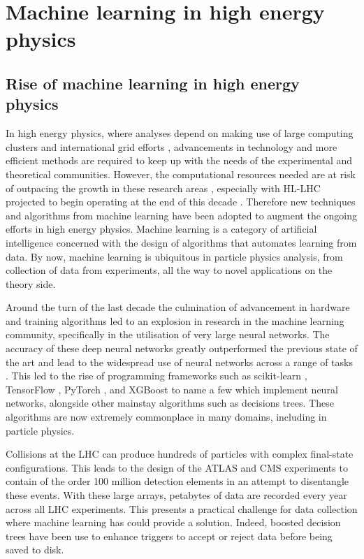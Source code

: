 \documentclass[main.tex]{subfiles}
\begin{document}
\chapter{Machine learning in high energy physics}
\label{chapter:ml}
\section{Rise of machine learning in high energy physics}
    In high energy physics, where analyses
    depend on making use of large computing clusters
    and international grid efforts \cite{WLCG}, advancements
    in technology and more efficient methods are
    required to keep up with the needs of the
    experimental and theoretical communities.
    However, the computational resources needed
    are at risk of outpacing the growth in these research
    areas \cite{Bothmann:2022thx}, especially with
    HL-LHC projected to begin operating at the end
    of this decade \cite{ZurbanoFernandez:2020cco}.
    Therefore new techniques and
    algorithms from machine learning 
    have been adopted to augment the ongoing efforts
    in high energy physics. Machine
    learning is a category of artificial intelligence
    concerned with the design of algorithms that
    automates learning from data.
    By now, machine learning is ubiquitous in
    particle physics analysis, from collection
    of data from experiments, all the way to novel
    applications on the theory side.

    Around the turn of the last decade the culmination
    of advancement in hardware and training algorithms
    led to an explosion in research in the
    machine learning community, specifically in the
    utilisation of very large neural networks. The accuracy
    of these deep neural networks greatly outperformed the
    previous state of the art \cite{NIPS2012_c399862d,russakovsky2015imagenet} and
    lead to the widespread use of neural networks across
    a range of tasks \cite{Schmidhuber_2015}.
    This led to the rise of programming
    frameworks such as scikit-learn \cite{scikit-learn},
    TensorFlow \cite{tensorflow2015-whitepaper},
    PyTorch \cite{paszke2019pytorch},
    and XGBoost \cite{Chen:2016:XST:2939672.2939785}
    to name a few which implement neural networks, alongside
    other mainstay algorithms such as decisions trees.
    These algorithms are now extremely commonplace
    in many domains, including in particle physics. 

    Collisions at the LHC can produce hundreds of
    particles with complex final-state configurations.
    This leads to the design of the ATLAS and CMS experiments
    to contain of the order 100 million detection elements
    in an attempt to disentangle these events. With these large
    arrays, petabytes of data are recorded every year
    across all LHC experiments.
    This presents a practical challenge for data
    collection where machine learning has could provide a solution.
    Indeed, boosted decision trees have been use
    to enhance triggers \cite{CMS:2020cmk} to accept or
    reject data before being saved to disk.
\end{document}
